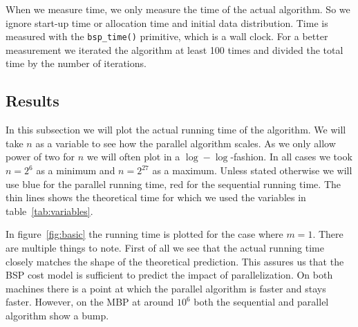 When we measure time, we only measure the time of the actual algorithm. So we ignore start-up time or allocation time and initial data distribution. Time is measured with the \texttt{bsp\_time()} primitive, which is a wall clock. For a better measurement we iterated the algorithm at least 100 times and divided the total time by the number of iterations.

\subsection{Results}
In this subsection we will plot the actual running time of the algorithm. We will take $n$ as a variable to see how the parallel algorithm scales. As we only allow power of two for $n$ we will often plot in a $\log-\log$-fashion. In all cases we took $n=2^6$ as a minimum and $n=2^27$ as a maximum. Unless stated otherwise we will use blue for the parallel running time, red for the sequential running time. The thin lines shows the theoretical time for which we used the variables in table~\ref{tab:variables}.

In figure~\ref{fig:basic} the running time is plotted for the case where $m=1$. There are multiple things to note. First of all we see that the actual running time closely matches the shape of the theoretical prediction. This assures us that the BSP cost model is sufficient to predict the impact of parallelization. On both machines there is a point at which the parallel algorithm is faster and stays faster. However, on the MBP at around $10^6$ both the sequential and parallel algorithm show a bump.

